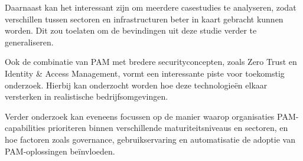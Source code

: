 Daarnaast kan het interessant zijn om meerdere casestudies te analyseren, zodat verschillen tussen sectoren en infrastructuren beter in kaart gebracht kunnen worden. Dit zou toelaten om de bevindingen uit deze studie verder te generaliseren.

Ook de combinatie van PAM met bredere securityconcepten, zoals Zero Trust en Identity & Access Management, vormt een interessante piste voor toekomstig onderzoek. Hierbij kan onderzocht worden hoe deze technologieën elkaar versterken in realistische bedrijfsomgevingen.

Verder onderzoek kan eveneens focussen op de manier waarop organisaties PAM-capabilities prioriteren binnen verschillende maturiteitsniveaus en sectoren, en hoe factoren zoals governance, gebruikservaring en automatisatie de adoptie van PAM-oplossingen beïnvloeden.

